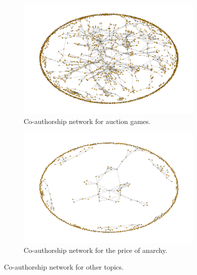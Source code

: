 \documentclass{article}
\begin{document}
\begin{center}
    \begin{figure}[!hbtp]
        \begin{subfigure}{0.5\textwidth}
            \includegraphics[width=\textwidth]{./assets/images/co-authors-network-auction.pdf}
            \caption{Co-authorship network for auction games.}
        \end{subfigure}
        \begin{subfigure}{0.5\textwidth}
            \includegraphics[width=\textwidth]{./assets/images/co-authors-network-price.pdf}
            \caption{Co-authorship network for the price of anarchy.}
        \end{subfigure}
    \caption{Co-authorship network for other topics.}
    \label{fig:co-authorship-other-topics}
    \end{figure}
    \end{center}
\end{document}
